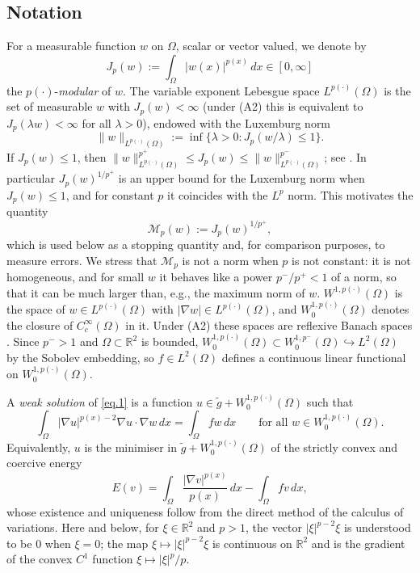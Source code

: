 \documentclass[11pt]{amsart}
\newcommand{\R}{\mathbb R}
\newcommand{\dx}{\,dx}
\newcommand{\pp}{p(\cdot)}
\theoremstyle{definition}
\theoremstyle{remark}
\numberwithin{equation}{section}
\begin{document}
\subsection{Notation}
For a measurable function $w$ on $\Omega$, scalar or vector valued, we denote by
$$
J_{p}(w) := \int_\Omega |w(x)|^{p(x)}\dx\in[0,\infty]
$$
the $p(\cdot)$-\emph{modular} of $w$. The variable exponent Lebesgue space $L^{\pp}(\Omega)$ is the set of measurable $w$ with $J_p(w)<\infty$ (under (A2) this is equivalent to $J_p(\lambda w)<\infty$ for all $\lambda>0$), endowed with the Luxemburg norm
$$
\|w\|_{L^{\pp}(\Omega)} := \inf\{\lambda>0\colon J_p(w/\lambda)\le 1\}.
$$
If $J_p(w)\le 1$, then $\|w\|_{L^{\pp}(\Omega)}^{p^+}\le J_p(w)\le\|w\|_{L^{\pp}(\Omega)}^{p^-}$; see \cite[Chapter~2]{DHHR}. In particular $J_p(w)^{1/p^+}$ is an upper bound for the Luxemburg norm when $J_p(w)\le1$, and for constant $p$ it coincides with the $L^p$ norm. This motivates the quantity
\begin{equation}\label{eq.pnorm}
\mathcal M_p(w) := J_p(w)^{1/p^+},
\end{equation}
which is used below as a stopping quantity and, for comparison purposes, to measure errors. We stress that $\mathcal M_p$ is not a norm when $p$ is not constant: it is not homogeneous, and for small $w$ it behaves like a power $p^-/p^+<1$ of a norm, so that it can be much larger than, e.g., the maximum norm of $w$. $W^{1,\pp}(\Omega)$ is the space of $w\in L^{\pp}(\Omega)$ with $|\nabla w|\in L^{\pp}(\Omega)$, and $W^{1,\pp}_0(\Omega)$ denotes the closure of $C^\infty_c(\Omega)$ in it. Under (A2) these spaces are reflexive Banach spaces \cite{DHHR}. Since $p^->1$ and $\Omega\subset\R^2$ is bounded, $W^{1,\pp}_0(\Omega)\subset W^{1,p^-}_0(\Omega)\hookrightarrow L^2(\Omega)$ by the Sobolev embedding, so $f\in L^2(\Omega)$ defines a continuous linear functional on $W^{1,\pp}_0(\Omega)$.

A \emph{weak solution} of \eqref{eq.1} is a function $u\in\tilde g+W^{1,\pp}_0(\Omega)$ such that
\begin{equation}\label{eq.weak}
\int_\Omega |\nabla u|^{p(x)-2}\nabla u\cdot\nabla w\dx=\int_\Omega fw\dx\qquad\text{for all } w\in W^{1,\pp}_0(\Omega).
\end{equation}
Equivalently, $u$ is the minimiser in $\tilde g+W^{1,\pp}_0(\Omega)$ of the strictly convex and coercive energy
\begin{equation}\label{eq.energy}
E(v) = \int_\Omega \frac{|\nabla v|^{p(x)}}{p(x)}\dx-\int_\Omega fv\dx ,
\end{equation}
whose existence and uniqueness follow from the direct method of the calculus of variations. Here and below, for $\xi\in\R^2$ and $p>1$, the vector $|\xi|^{p-2}\xi$ is understood to be $0$ when $\xi=0$; the map $\xi\mapsto|\xi|^{p-2}\xi$ is continuous on $\R^2$ and is the gradient of the convex $C^1$ function $\xi\mapsto|\xi|^p/p$.
\end{document}
